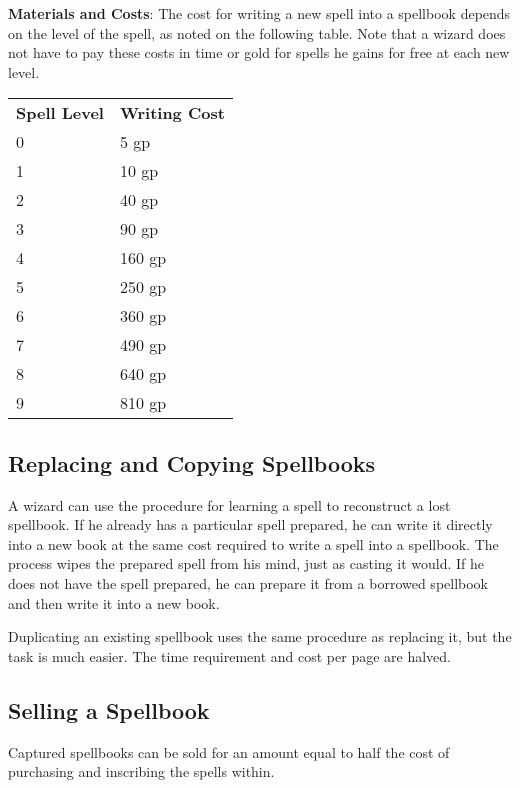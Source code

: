\textbf{Materials and Costs}: The cost for writing a new spell into a spellbook depends on the level of the spell, as noted on the following table. Note that a wizard does not have to pay these costs in time or gold for spells he gains for free at each new level.

\begin{table}
\sffamily
 \begin{tabular}{ll}
\textbf{Spell Level} & \textbf{Writing Cost}\\
0 & 5 gp\\
1 & 10 gp\\
2 & 40 gp\\
3 & 90 gp\\
4 & 160 gp\\
5 & 250 gp\\
6 & 360 gp\\
7 & 490 gp\\
8 & 640 gp\\
9 & 810 gp\\
 \end{tabular}

\end{table}


				
\subsection{Replacing and Copying Spellbooks}

				
A wizard can use the procedure for learning a spell to reconstruct a lost spellbook. If he already has a particular spell prepared, he can write it directly into a new book at the same cost required to write a spell into a spellbook. The process wipes the prepared spell from his mind, just as casting it would. If he does not have the spell prepared, he can prepare it from a borrowed spellbook and then write it into a new book.
				
Duplicating an existing spellbook uses the same procedure as replacing it, but the task is much easier. The time requirement and cost per page are halved.
				
\subsection{Selling a Spellbook}

				
Captured spellbooks can be sold for an amount equal to half the cost of purchasing and inscribing the spells within.
				
